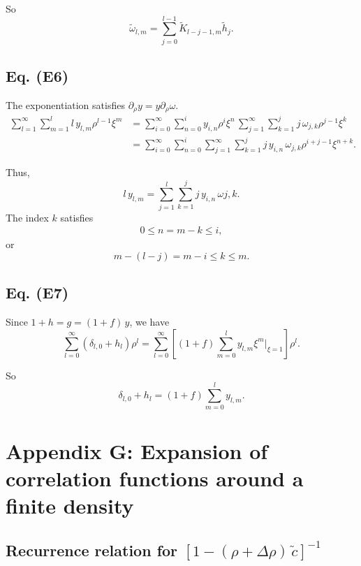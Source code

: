 \documentclass[preprint]{revtex4-1}
\numberwithin{equation}{subsection}
\numberwithin{table}{section}
\begin{document}
So
\[
  \tilde \omega_{l,m}
=
  \sum_{j = 0}^{l-1}
  \tilde K_{l - j - 1, m}
  \tilde h_{j}.
\]



\subsection{Eq. (E6)}

The exponentiation satisfies $\partial_\rho y = y \partial_\rho \omega$.
\begin{align*}
\sum_{l = 1}^\infty
\sum_{m = 1}^l
l \, y_{l, m} \rho^{l-1} \xi^m
&=
\sum_{i = 0}^\infty
\sum_{n = 0}^i
y_{i, n} \rho^{i} \xi^n
\,
\sum_{j = 1}^\infty
\sum_{k = 1}^j
j \, \omega_{j, k} \rho^{j-1} \xi^k
\\
&=
\sum_{i = 0}^\infty
\sum_{n = 0}^i
\sum_{j = 1}^\infty
\sum_{k = 1}^j
j \, y_{i, n} \,
\omega_{j, k} \rho^{i+j-1} \xi^{n+k}.
\end{align*}

Thus,
\[
  l \, y_{l,m}
=
\sum_{j = 1}^{l} \sum_{k = 1}^j
j \, y_{i, n} \, \omega{j, k}.
\]
The index $k$ satisfies
\begin{align*}
   0 \le n = m - k \le i,
\end{align*}
or
\[
  m - (l - j) = m - i \le k \le m.
\]


\subsection{Eq. (E7)}

Since $1+h = g = (1+f) \,y$, we have
\[
  \sum_{l = 0}^\infty (\delta_{l,0} + h_{l}) \rho^l
=
  \sum_{l = 0}^\infty
  \left[
    (1 + f) \sum_{m = 0}^l y_{l, m} \xi^m \Big|_{\xi = 1}
  \right] \rho^l.
\]

So
\[
  \delta_{l, 0} + h_l
  = (1 + f) \sum_{m=0}^l
  y_{l, m}.
\]



\section{Appendix G: Expansion of correlation functions around a finite density}


\subsection{Recurrence relation for $[1 - (\rho + \Delta \rho) \, \tilde c]^{-1}$}
\end{document}
